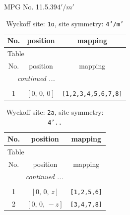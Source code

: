 \documentclass[fleqn,8pt]{jsarticle}
\begin{document}
\setcounter{MaxMatrixCols}{32}

\renewcommand{\tablename}{Table~}
\renewcommand{\figurename}{Figure~}
\begin{center}
\LARGE
MPG No. 11.5.39\quad$4'/m'$
\end{center}
\renewcommand{\arraystretch}{1.2}
\begin{longtable}{ccc}
\caption{Wyckoff site: {\tt 1o}, site symmetry: {\tt 4'/m'}}
 \\
 \hline \hline
No. & position & mapping \\ \hline \endfirsthead

\multicolumn{2}{l}{\tablename\ \thetable{}} \\
 \hline \hline
No. & position & mapping \\ \hline \endhead

 \hline \hline
\multicolumn{2}{r}{\footnotesize\it continued ...} \\ \endfoot

 \hline \hline
\multicolumn{2}{r}{} \\ \endlastfoot

1 & $\left[ 0,\, 0,\, 0 \right]$ & {\tt [1,2,3,4,5,6,7,8]} \\
\end{longtable}
\renewcommand{\arraystretch}{1.2}
\begin{longtable}{ccc}
\caption{Wyckoff site: {\tt 2a}, site symmetry: {\tt 4'..}}
 \\
 \hline \hline
No. & position & mapping \\ \hline \endfirsthead

\multicolumn{2}{l}{\tablename\ \thetable{}} \\
 \hline \hline
No. & position & mapping \\ \hline \endhead

 \hline \hline
\multicolumn{2}{r}{\footnotesize\it continued ...} \\ \endfoot

 \hline \hline
\multicolumn{2}{r}{} \\ \endlastfoot

1 & $\left[ 0,\, 0,\, z \right]$ & {\tt [1,2,5,6]} \\ \hline
2 & $\left[ 0,\, 0,\, - z \right]$ & {\tt [3,4,7,8]} \\
\end{longtable}
\renewcommand{\arraystretch}{1.2}
\end{document}
